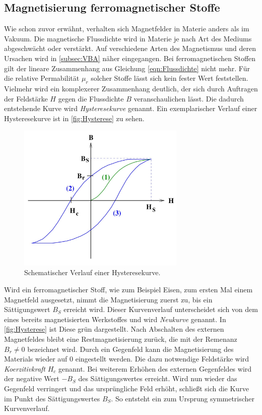 \subsection{Magnetisierung ferromagnetischer Stoffe}
\label{subsec:Hysterese}
Wie schon zuvor erwähnt, verhalten sich Magnetfelder in Materie anders als im Vakuum. Die magnetische Flussdichte wird in Materie je nach Art des Mediums
abgeschwächt oder verstärkt. Auf verschiedene Arten des Magnetismus und deren Ursachen wird in \autoref{subsec:VBA} näher eingegangen. Bei ferromagnetischen Stoffen gilt der lineare 
Zusammenhang aus Gleichung \eqref{eqn:Flussdichte} nicht mehr. Für die relative Permabilität $\mu_r$ solcher Stoffe lässt sich kein fester Wert feststellen. Vielmehr wird ein 
komplexerer Zusammenhang deutlich, der sich durch Auftragen der Feldstärke $H$ gegen die Flussdichte $B$ veranschaulichen lässt. Die dadurch entstehende Kurve wird 
\textit{Hysteresekurve} genannt. Ein exemplarischer Verlauf einer Hysteresekurve ist in \autoref{fig:Hysterese} zu sehen.

\begin{figure}
    \centering
    \caption{Schematischer Verlauf einer Hysteresekurve. \cite{v308}}
    \label{fig:Hysterese}
    \includegraphics[width=8cm]{content/Hysteresekurve.jpg}
\end{figure}

Wird ein ferromagnetischer Stoff, wie zum Beispiel Eisen, zum ersten Mal einem Magnetfeld ausgesetzt, nimmt die Magnetisierung zuerst zu, bis ein Sättigungswert $B_S$ erreicht wird.
Dieser Kurvenverlauf unterscheidet sich von dem eines bereits magnetisierten Werkstoffes und wird \textit{Neukurve} genannt. In \autoref{fig:Hysterese} ist Diese grün dargestellt. 
Nach Abschalten des externen Magnetfeldes bleibt eine Restmagnetisierung zurück, die mit der Remenanz $B_r \neq 0$ bezeichnet wird. Durch ein Gegenfeld kann die
Magnetisierung des Materials wieder auf 0 eingestellt werden. Die dazu notwendige Feldstärke wird \textit{Koerzitivkraft} $H_c$ genannt. Bei weiterem Erhöhen des externen 
Gegenfeldes wird der negative Wert $-B_S$ des Sättigungswertes erreicht. Wird nun wieder das Gegenfeld verringert und das ursprüngliche Feld erhöht, schließt sich die Kurve 
im Punkt des Sättigungswertes $B_S$. So entsteht ein zum Ursprung symmetrischer Kurvenverlauf.
